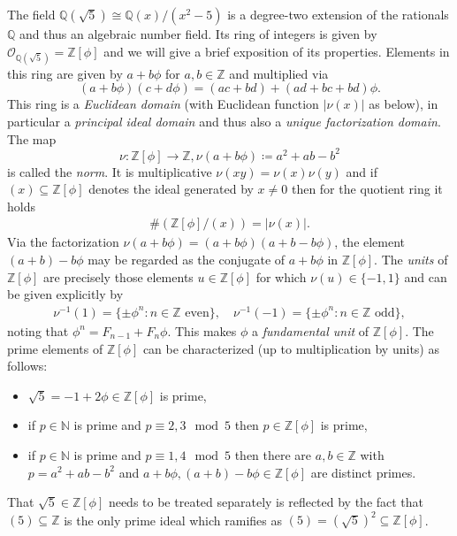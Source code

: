 \documentclass[]{interact}
\newcommand{\bbN}{\mathbb{N}}
\newcommand{\bbQ}{\mathbb{Q}}
\newcommand{\bbZ}{\mathbb{Z}}
\newcommand{\cO}{\mathcal{O}}
\newcommand{\ra}{\rightarrow}
\newcommand{\sbse}{\subseteq}
\theoremstyle{definition}
\numberwithin{table}{section} %
\numberwithin{figure}{section}
\begin{document}
The field $\bbQ(\sqrt5) \cong \bbQ(x)/(x^2-5)$ is a degree-two extension of the rationals $\bbQ$ and thus an algebraic number field. Its ring of integers is given by $\cO_{\bbQ(\sqrt5)} = \bbZ[\phi]$ and we will give a brief exposition of its properties. Elements in this ring are given by $a+b\phi$ for $a, b \in \bbZ$ and multiplied via
$$
(a+b\phi)(c+d\phi) = (ac+bd) + (ad+bc+bd)\phi.
$$
This ring is a \emph{Euclidean domain} (with Euclidean function $|\nu(x)|$ as below), in particular a \emph{principal ideal domain} and thus also a \emph{unique factorization domain}. The map
$$
\nu: \bbZ[\phi] \ra \bbZ, \nu(a+b\phi) \coloneqq a^2 + ab - b^2
$$
is called the \emph{norm}. It is multiplicative $\nu(xy) = \nu(x) \nu(y)$ and if $(x) \sbse \bbZ[\phi]$ denotes the ideal generated by $x \neq 0$ then for the quotient ring it holds
\begin{align} \label{eq:quot_card}
    \#(\bbZ[\phi]/(x)) = |\nu(x)|.
\end{align}
Via the factorization $\nu(a+b\phi) = (a+b\phi)(a+b-b\phi)$, the element $(a+b)-b\phi$ may be regarded as the conjugate of $a+b\phi$ in $\bbZ[\phi]$. The \emph{units} of $\bbZ[\phi]$ are precisely those elements $u \in \bbZ[\phi]$ for which $\nu(u) \in \{-1, 1\}$ and can be given explicitly by
\begin{align} \label{eq:units}
    \nu^{-1}(1) = \{\pm \phi^n: n \in \bbZ \text{ even}\}, \quad \nu^{-1}(-1) = \{\pm \phi^n: n \in \bbZ \text{ odd}\},
\end{align}
noting that $\phi^n = F_{n-1} + F_{n}\phi$. This makes $\phi$ a \emph{fundamental unit} of $\bbZ[\phi]$. The prime elements of $\bbZ[\phi]$ can be characterized (up to multiplication by units) as follows:
\begin{itemize}
    \item [(i)] $\sqrt5 = -1+2\phi \in \bbZ[\phi]$ is prime,

    \item [(ii)] if $p \in \bbN$ is prime and $p \equiv 2, 3 \mod 5$ then $p \in \bbZ[\phi]$ is prime,

    \item [(iii)] if $p \in \bbN$ is prime and $p \equiv 1, 4 \mod 5$ then there are $a, b \in \bbZ$ with $p=a^2+ab-b^2$ and $a+b\phi,(a+b)-b\phi \in \bbZ[\phi]$ are distinct primes.
\end{itemize}
That $\sqrt5 \in \bbZ[\phi]$ needs to be treated separately is reflected by the fact that $(5) \sbse \bbZ$ is the only prime ideal which ramifies as $(5) = (\sqrt5)^2 \sbse \bbZ[\phi]$.
\end{document}
